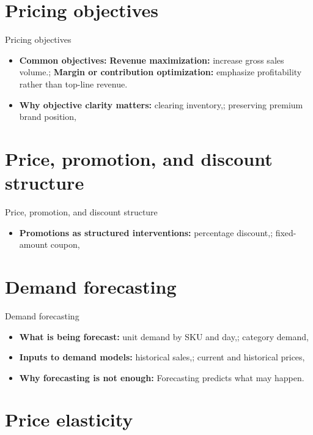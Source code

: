\documentclass[aspectratio=169]{beamer}
\begin{document}
\section{Pricing objectives}

\begin{frame}{Pricing objectives}
  \begin{itemize}
    \item \textbf{Common objectives:} \textbf{Revenue maximization:} increase gross sales volume.; \textbf{Margin or contribution optimization:} emphasize profitability rather than top-line revenue.
    \item \textbf{Why objective clarity matters:} clearing inventory,; preserving premium brand position,
  \end{itemize}
\end{frame}

\section{Price, promotion, and discount structure}

\begin{frame}{Price, promotion, and discount structure}
  \begin{itemize}
    \item \textbf{Promotions as structured interventions:} percentage discount,; fixed-amount coupon,
  \end{itemize}
\end{frame}

\section{Demand forecasting}

\begin{frame}{Demand forecasting}
  \begin{itemize}
    \item \textbf{What is being forecast:} unit demand by SKU and day,; category demand,
    \item \textbf{Inputs to demand models:} historical sales,; current and historical prices,
    \item \textbf{Why forecasting is not enough:} Forecasting predicts what may happen.
  \end{itemize}
\end{frame}

\section{Price elasticity}
\end{document}
